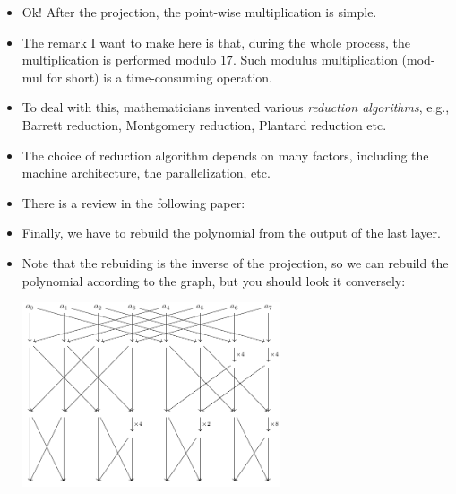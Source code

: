 \begin{frame}
    \begin{itemize}
        \item Ok! After the projection, the point-wise multiplication is simple. 
        \item The remark I want to make here is that, during the whole process, the multiplication is performed modulo \( 17 \). 
        Such modulus multiplication (mod-mul for short) is a time-consuming operation.
        \item To deal with this, mathematicians invented various \emph{reduction algorithms}, e.g., Barrett reduction, Montgomery reduction, Plantard reduction etc.
        \item The choice of reduction algorithm depends on many factors, including the machine architecture, the parallelization, etc.
        \item There is a review in the following paper:

    \end{itemize}
\end{frame}

\begin{frame}
\begin{itemize}
    \item Finally, we have to rebuild the polynomial from the output of the last layer.
    \item Note that the rebuiding is the inverse of the projection, so we can rebuild the polynomial according to the graph, but you should look it conversely:
    \begin{center}
        \includegraphics[width=0.6\textwidth]{figures/compiled/tikzcd5.pdf}
    \end{center}
\end{itemize}
\end{frame}
